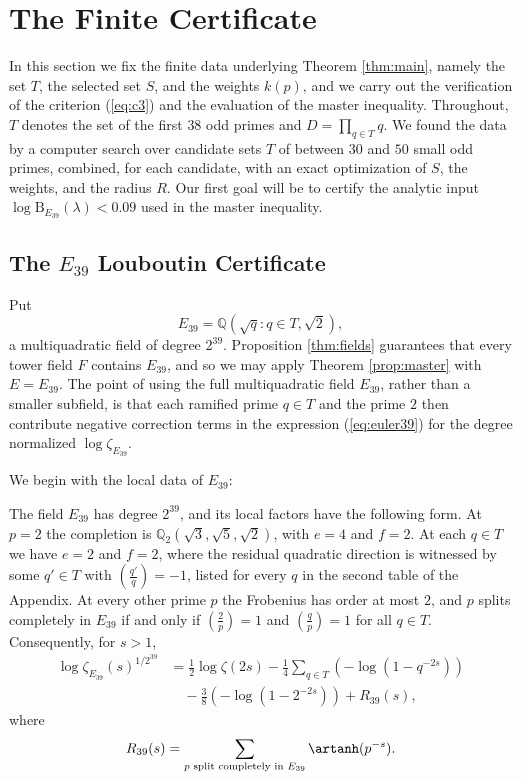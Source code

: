 \section{The Finite Certificate}\label{sec:certificate}

In this section we fix the finite data underlying Theorem \ref{thm:main}, namely the set $T$, the selected set $S$, and the weights $k(p)$, and we carry out the verification of the criterion (\ref{eq:c3}) and the evaluation of the master inequality.  Throughout, $T$ denotes the set of the first $38$ odd primes and $D=\prod_{q\in T}q$.  We found the data by a computer search over candidate sets $T$ of between $30$ and $50$ small odd primes, combined, for each candidate, with an exact optimization of $S$, the weights, and the radius $R$.  Our first goal will be to certify the analytic input $\log \mathrm{B}_{E_{39}}(\lambda)<0.09$ used in the master inequality.

\subsection{The $E_{39}$ Louboutin Certificate}\label{sec:e39}

Put
\[
   E_{39}=\mathbb{Q}(\sqrt q:q\in T,\sqrt2),
\]
a multiquadratic field of degree $2^{39}$.  Proposition \ref{thm:fields} guarantees that every tower field $F$ contains $E_{39}$, and so we may apply Theorem \ref{prop:master} with $E=E_{39}$.  The point of using the full multiquadratic field $E_{39}$, rather than a smaller subfield, is that each ramified prime $q\in T$ and the prime $2$ then contribute negative correction terms in the expression (\ref{eq:euler39}) for the degree normalized $\log\zeta_{E_{39}}$.

We begin with the local data of $E_{39}$:
\begin{lemma}\label{lem:E39local}
The field $E_{39}$ has degree $2^{39}$, and its local factors have the following form.  At $p=2$ the completion is $\mathbb{Q}_2(\sqrt3,\sqrt5,\sqrt2)$, with $e=4$ and $f=2$.  At each $q\in T$ we have $e=2$ and $f=2$, where the residual quadratic direction is witnessed by some $q'\in T$ with $\left(\frac{q'}{q}\right)=-1$, listed for every $q$ in the second table of the Appendix.  At every other prime $p$ the Frobenius has order at most $2$, and $p$ splits completely in $E_{39}$ if and only if $\left(\frac{2}{p}\right)=1$ and $\left(\frac{q}{p}\right)=1$ for all $q\in T$.  Consequently, for $s>1$,
\begin{equation}\label{eq:euler39}
\begin{aligned}
   \log\zeta_{E_{39}}(s)^{1/2^{39}}
   &=\frac12\log\zeta(2s)
   -\frac14\sum_{q\in T}\left(-\log(1-q^{-2s})\right)  \\
   &\quad -\frac38\left(-\log(1-2^{-2s})\right)
   +R_{39}(s),
\end{aligned}
\end{equation}
where
\[
   R_{39}(s)=\sum_{p\text{ split completely in }E_{39}}\artanh(p^{-s}).
\]
\end{lemma}

